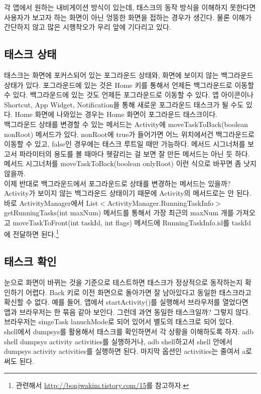 각 앱에서 원하는 내비게이션 방식이 있는데, 태스크의 동작 방식을 이해하지 못한다면 사용자가 보고자 하는 화면이 아닌 엉뚱한 화면을 접하는 경우가 생긴다. 물론 이해가 간단하지 않고 많은 시행착오가 우리 앞에 기다리고 있다.

\subsection{태스크 상태}
태스크는 화면에 포커스되어 있는 포그라운드 상태와, 화면에 보이지 않는 백그라운드 상태가 있다. 포그라운드에 있는 것은 Home 키를 통해서 언제든 백그라운드로 이동할 수 있다.
백그라운드에 있는 것도 언제든 포그라운드로 이동할 수 있다. 앱 아이콘이나 Shortcut, App Widget, Notification을 통해 새로운 포그라운드 태스크가 될 수도 있다. Home 화면에 나와있는 경우는 Home 화면이 포그라운드 태스크이다.\\

백그라운드 상태를 변경할 수 있는 메서드는 Activity에 moveTaskToBack(boolean nonRoot) 메서드가 있다. nonRoot에 true가 들어가면 어느 위치에서건 백그라운드로 이동할 수 있고, false인 경우에는 태스크 루트일 때만 가능하다. 
메서드 시그너처를 보고서 파라미터의 용도를 볼 때마다 헷갈리는 걸 보면 잘 만든 메서드는 아닌 듯 하다. 메서드 시그너처를 moveTaskToBack(boolean onlyRoot) 이런 식으로 바꾸면 좀 낫지 않을까. \\

이제 반대로 백그라운드에서 포그라운드로 상태를 변경하는 메서드는 있을까? 
Activity가 보이지 않는 백그라운드 상태이기 때문에 Activity의 메서드로는 안 된다.
바로 ActivityManager에서 
List$<$ActivityManager.Running\-TaskInfo$>$ getRunningTasks(int maxNum) 메서드를 통해서 가장 최근의 maxNum 개를 가져오고 moveTaskToFront(int taskId, int flags) 메서드에 RunningTaskInfo.id를 taskId에 전달하면 된다.\footnote{관련해서 \url{http://bonjwakim.tistory.com/15}를 참고하자.}

\subsection{태스크 확인}
눈으로 화면이 바뀌는 것을 기준으로 테스트하면 태스크가 정상적으로 동작하는지 확인하기 어렵다. Back 키로 이전 화면으로 돌아가면 잘 남아있다고 동일한 태스크라고 확신할 수 없다.
예를 들어, 앱에서 startActivity()를 실행해서 브라우저를 열었다면 앱과 브라우저는 한 묶음 같아 보인다. 그런데 과연 동일한 태스크일까? 그렇지 않다. 브라우저는 singeTask lanuchMode로 되어 있어서 별도의 태스크로 되어 있다.\\

shell에서 dumpsys를 활용해서 태스크를 확인하면서 각 상황을 이해하도록 하자.
adb shell dumpsys activity activities를 실행하거나, adb shell하고서 shell 안에서 dumpsys activity activities를 실행하면 된다. 마지막 옵션인 activities는 줄여서 a로 써도 된다.\\

